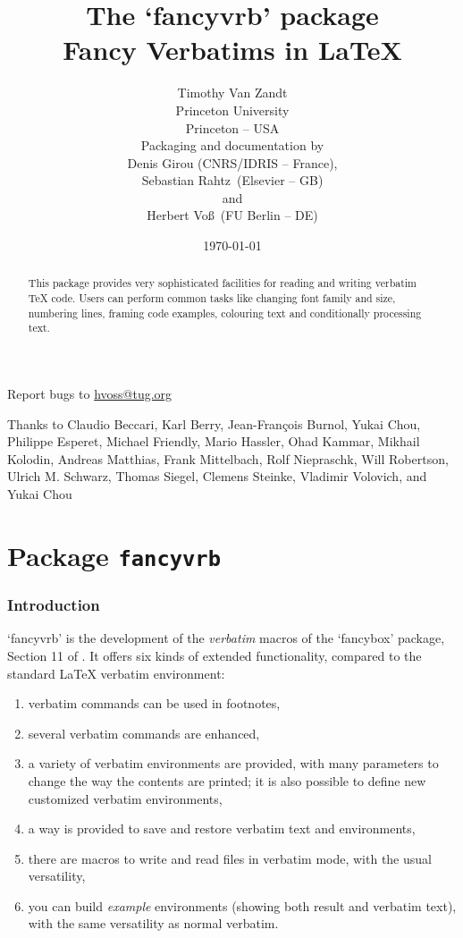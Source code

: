 \documentclass[twoside]{article}
\title{The `\textsf{fancyvrb}' package\\Fancy Verbatims in \LaTeX}
\author{Timothy Van Zandt\\Princeton University\\Princeton -- USA\\[5mm]
        {Packaging and documentation by}\\
        {\footnotesize Denis Girou (CNRS/IDRIS -- France),}\\[-2mm]
        {\footnotesize Sebastian Rahtz\dagger\ (Elsevier -- GB)}\\[-2mm]
        {\footnotesize and}\\[-2mm]
        {\footnotesize Herbert Voß\ (FU Berlin -- DE)}
        }
\date{\today}
\newcommand\FBoxPackage{`\textsf{fancybox}'}
\newcommand\FVrbPackage{`\textsf{fancyvrb}'}
\begin{document}
\maketitle
%
\begin{abstract}
    This package provides very sophisticated facilities for reading and
  writing verbatim \TeX{} code. Users can perform common tasks like changing
  font family and size, numbering lines, framing code examples, colouring
  text and conditionally processing text.
\end{abstract}

\begin{center}
Report bugs to \url{hvoss@tug.org}
\end{center}

\vfill
Thanks to 
Claudio Beccari,
Karl Berry,
Jean-François Burnol, 
Yukai Chou,
Philippe Esperet, %
Michael Friendly, %
Mario Hassler, %
Ohad Kammar, %
Mikhail Kolodin, %
Andreas Matthias,
Frank Mittelbach,
Rolf Niepraschk, %
Will Robertson,
Ulrich M. Schwarz, 
Thomas Siegel, %
Clemens Steinke,
Vladimir Volovich,
and 
Yukai Chou 
\clearpage
\tableofcontents
\clearpage


\part{Package \texttt{fancyvrb}}


\section{Introduction}
%
\FVrbPackage{} is the development of the \emph{verbatim} macros of the
\FBoxPackage{} package,  Section 11 of \cite{ctan-fancybox}. It offers six kinds
of extended functionality, compared to the standard \LaTeX{}
\textsf{verbatim} environment:

\begin{enumerate}
  \item verbatim commands can be used in footnotes,
  \item several verbatim commands are enhanced,
  \item a variety of verbatim environments are provided, with many
  parameters to change the way the contents are printed; it is also possible
  to define new customized verbatim environments,
  \item a way is provided to save and restore verbatim text and environments,
  \item there are macros to write and read files in verbatim mode, with the
  usual versatility,
  \item you can build \emph{example} environments (showing both result and
  verbatim text), with the same versatility as normal verbatim.
\end{enumerate}
\end{document}
